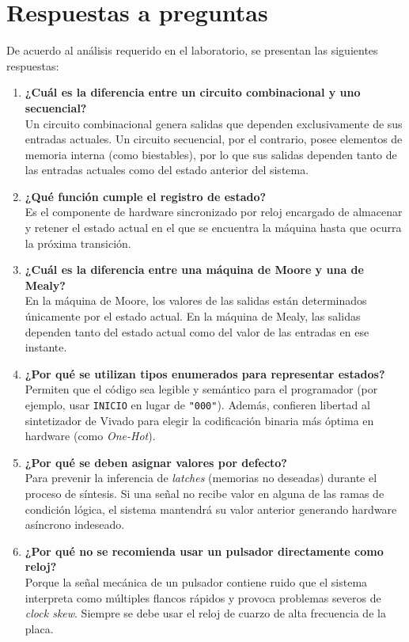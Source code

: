 \documentclass[letterpaper,12pt]{article}
\begin{document}
\section{Respuestas a preguntas}
De acuerdo al análisis requerido en el laboratorio, se presentan las siguientes respuestas:
\begin{enumerate}
    \item \textbf{¿Cuál es la diferencia entre un circuito combinacional y uno secuencial?}\\
    Un circuito combinacional genera salidas que dependen exclusivamente de sus entradas actuales. Un circuito secuencial, por el contrario, posee elementos de memoria interna (como biestables), por lo que sus salidas dependen tanto de las entradas actuales como del estado anterior del sistema.
    
    \item \textbf{¿Qué función cumple el registro de estado?}\\
    Es el componente de hardware sincronizado por reloj encargado de almacenar y retener el estado actual en el que se encuentra la máquina hasta que ocurra la próxima transición.
    
    \item \textbf{¿Cuál es la diferencia entre una máquina de Moore y una de Mealy?}\\
    En la máquina de Moore, los valores de las salidas están determinados únicamente por el estado actual. En la máquina de Mealy, las salidas dependen tanto del estado actual como del valor de las entradas en ese instante.
    
    \item \textbf{¿Por qué se utilizan tipos enumerados para representar estados?}\\
    Permiten que el código sea legible y semántico para el programador (por ejemplo, usar \texttt{INICIO} en lugar de \texttt{"000"}). Además, confieren libertad al sintetizador de Vivado para elegir la codificación binaria más óptima en hardware (como \textit{One-Hot}).
    
    \item \textbf{¿Por qué se deben asignar valores por defecto?}\\
    Para prevenir la inferencia de \textit{latches} (memorias no deseadas) durante el proceso de síntesis. Si una señal no recibe valor en alguna de las ramas de condición lógica, el sistema mantendrá su valor anterior generando hardware asíncrono indeseado.
    
    \item \textbf{¿Por qué no se recomienda usar un pulsador directamente como reloj?}\\
    Porque la señal mecánica de un pulsador contiene ruido que el sistema interpreta como múltiples flancos rápidos y provoca problemas severos de \textit{clock skew}. Siempre se debe usar el reloj de cuarzo de alta frecuencia de la placa.
    

\end{enumerate}
\end{document}
